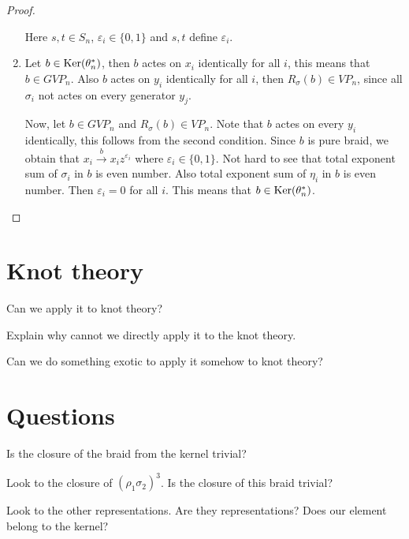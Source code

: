 \documentclass{article}
\begin{document}
\begin{proof}
\begin{enumerate}
Here $s,t\in S_n$, $\varepsilon_i \in \{0,1\}$ and $s,t$ define $\varepsilon_i$. 



\item Let $b\in {\rm Ker}(\theta_n^*)$, then $b$ actes on $x_i$ identically for all $i$, this means that $b\in GVP_n$. Also $b$ actes on $y_i$ identically for all $i$, then $R_{\sigma}(b)\in VP_n$, since all $\sigma_i$ not actes on every generator $y_j$.



Now, let $b\in GVP_n$ and $R_{\sigma}(b)\in VP_n$. Note that $b$ actes on every $y_i$ identically, this follows from the second condition. Since $b$ is pure braid, we obtain that $x_i\xrightarrow{b}x_iz^{\varepsilon_i}$ where $\varepsilon_i\in \{0, 1\}$. Not hard to see that total exponent sum of $\sigma_i$ in $b$ is even number. Also total exponent sum of $\eta_i$ in $b$ is even number. Then $\varepsilon_i=0$ for all $i$. This means that $b\in {\rm Ker}(\theta_n^*)$.

\end{enumerate}

\end{proof}



\section{Knot theory}

Can we apply it to knot theory?



Explain why cannot we directly apply it to the knot theory.



Can we do something exotic to apply it somehow to knot theory?



\section{Questions}

Is the closure of the braid from the kernel trivial?



Look to the closure of $(\rho_1\sigma_2)^3$. Is the closure of this braid trivial?



Look to the other representations. Are they representations? Does our element belong to the kernel?
\end{document}
